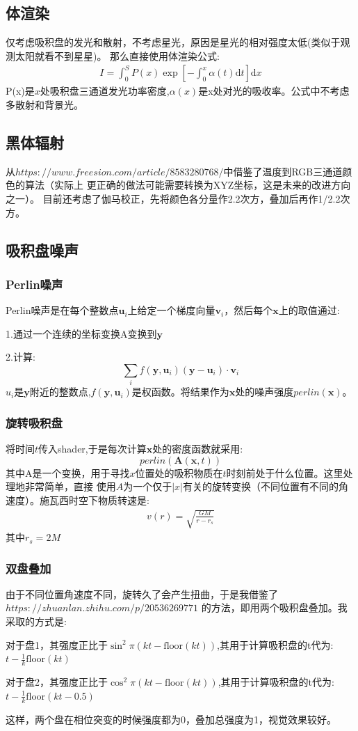 \documentclass[a4paper, 12pt]{article}
\begin{document}
    \subsection{体渲染}
    仅考虑吸积盘的发光和散射，不考虑星光，原因是星光的相对强度太低(类似于观测太阳就看不到星星)。
    那么直接使用体渲染公式:
    \begin{align*}
        I = \int_{0}^{S}P(x)\exp[-\int_0^x \alpha(t) \mathrm d t]\mathrm d x
    \end{align*}
    P(x)是$x$处吸积盘三通道发光功率密度,$\alpha(x)$是x处对光的吸收率。公式中不考虑多散射和背景光。
    \subsection{黑体辐射}
    从$https://www.freesion.com/article/8583280768/$中借鉴了温度到RGB三通道颜色的算法（实际上
    更正确的做法可能需要转换为XYZ坐标，这是未来的改进方向之一）。
    目前还考虑了伽马校正，先将颜色各分量作2.2次方，叠加后再作1/2.2次方。
    \subsection{吸积盘噪声}
    \subsubsection{Perlin噪声}
    Perlin噪声是在每个整数点$\mathbf u_i$上给定一个梯度向量$\mathbf v_i$，然后每个$\mathbf x$上的取值通过:
    \par
    1.通过一个连续的坐标变换A变换到$\mathbf y$ \par
    2.计算:
    \[\sum_{i} f(\mathbf y,\mathbf u_i)(\mathbf y - \mathbf u_i)\cdot \mathbf v_i \]
    $u_i$是$\mathbf y$附近的整数点,$f(\mathbf y,\mathbf u_i)$是权函数。将结果作为$\mathbf x$处的噪声强度$perlin(\mathbf x)$。
    \subsubsection{旋转吸积盘}
    将时间$t$传入shader,于是每次计算$\mathbf x$处的密度函数就采用:
    \[perlin(\mathbf A(\mathbf x,t))\]
    其中A是一个变换，用于寻找$x$位置处的吸积物质在$t$时刻前处于什么位置。这里处理地非常简单，直接
    使用$A$为一个仅于$|x|$有关的旋转变换（不同位置有不同的角速度）。施瓦西时空下物质转速是:
    \begin{align*}
        v(r) = \sqrt{\frac{GM}{r - r_s}}
    \end{align*}
    其中$r_s = 2M$\par
    \subsubsection{双盘叠加}
    由于不同位置角速度不同，旋转久了会产生扭曲，于是我借鉴了$https://zhuanlan.zhihu.com/p/20536269771$
    的方法，即用两个吸积盘叠加。我采取的方式是:
    \par
    对于盘1，其强度正比于$\sin^2 \pi (kt-\mathrm{floor}(kt))$,其用于计算吸积盘的t代为:
    $t-\frac{1}{k}\mathrm{floor}(kt)$
    \par
    对于盘2，其强度正比于$\cos^2 \pi (kt-\mathrm{floor}(kt))$,其用于计算吸积盘的t代为:
    $t-\frac{1}{k}\mathrm{floor}(kt-0.5)$  \par
    这样，两个盘在相位突变的时候强度都为0，叠加总强度为1，视觉效果较好。
\end{document}
